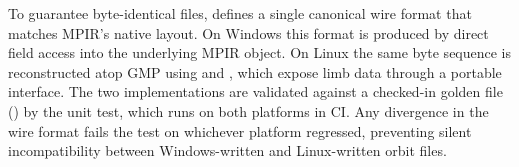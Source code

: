 To guarantee byte-identical files, \FractalShark{} defines a single canonical
wire format that matches MPIR's native  layout. On
Windows this format is produced by direct field access into the underlying
MPIR object. On Linux the same byte sequence is reconstructed atop GMP using
 and , which expose limb data through a
portable interface. The two implementations are validated against a checked-in
golden file () by the 
unit test, which runs on both platforms in CI. Any divergence in the wire
format fails the test on whichever platform regressed, preventing silent
incompatibility between Windows-written and Linux-written orbit files.
